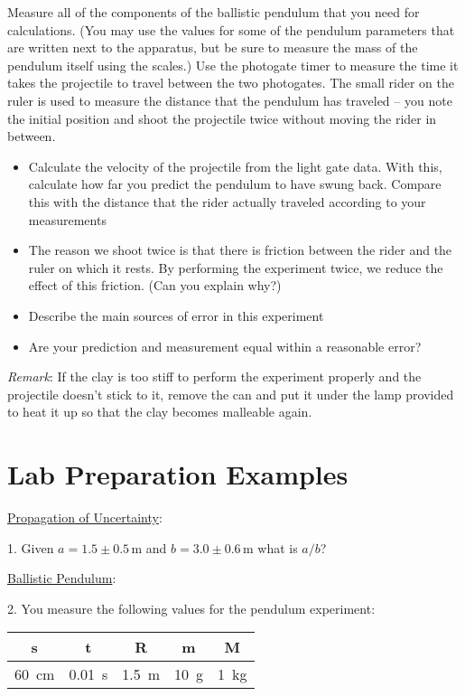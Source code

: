 Measure all of the components of the ballistic pendulum that you need for calculations. (You may use the values for some of the pendulum parameters that are written next to the apparatus, but be sure to measure the mass of the pendulum itself using the scales.) Use the photogate timer to measure the time it takes the projectile to travel between the two photogates. The small rider on the ruler is used to measure the distance that the pendulum has traveled -- you note the initial position and shoot the projectile twice without moving the rider in between. 
\begin{itemize}
\item Calculate the velocity of the projectile from the light gate data. With this, calculate how far you predict the pendulum to have swung back. Compare this with the distance that the rider actually traveled according to your measurements
\item The reason we shoot twice is that there is friction between the rider and the ruler on which it rests. By performing the experiment twice, we reduce the effect of this friction. (Can you explain why?)
\item Describe the main sources of error in this experiment
\item Are your prediction and measurement equal within a reasonable error?
\end{itemize}

\emph{Remark}: If the clay is too stiff to perform the experiment properly and the projectile doesn’t stick to it, remove the can and put it under the lamp provided to heat it up so that the clay becomes malleable again.
\section{Lab Preparation Examples}
\noindent\underline{Propagation of Uncertainty}:\myskip

1. Given $a = 1.5 \pm 0.5\, \textrm{m}$ and $b = 3.0 \pm 0.6\, \textrm{m}$ what is $a/b$?\myskip

\noindent\underline{Ballistic Pendulum}:\myskip

2. You measure the following values for the pendulum experiment:
\begin{table}[h]
  \centering
  \begin{tabular}{|c|c|c|c|c|}
    \hline
    s&t&R&m&M\\
    \hline
    60\ \textrm{cm}&0.01\ \textrm{s}&1.5\ \textrm{m}&10\ \textrm{g}&1\ \textrm{kg}\\
    \hline
  \end{tabular}
\end{table}

